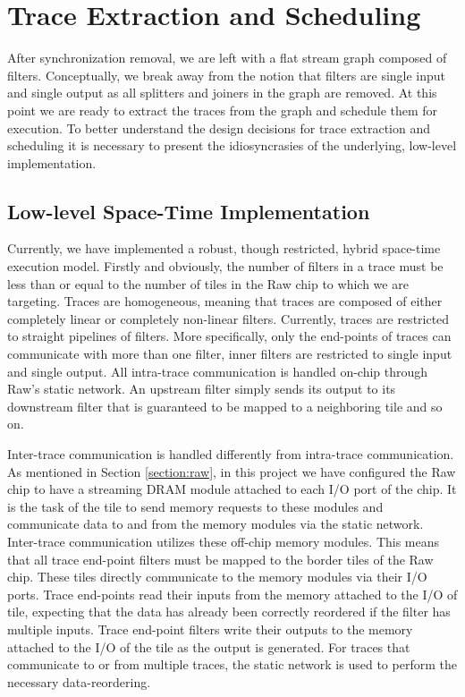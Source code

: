 \section{Trace Extraction and Scheduling}
\label{sec:traces}
After synchronization removal, we are left with a flat stream graph
composed of filters.  Conceptually, we break away from the notion that
filters are single input and single output as all splitters and
joiners in the graph are removed.  At this point we are ready to
extract the traces from the graph and schedule them for execution.  To
better understand the design decisions for trace extraction and
scheduling it is necessary to present the idiosyncrasies of the
underlying, low-level implementation.

\subsection{Low-level Space-Time Implementation}
Currently, we have implemented a robust, though restricted, hybrid
space-time execution model.  Firstly and obviously, the number of
filters in a trace must be less than or equal to the number of tiles
in the Raw chip to which we are targeting.  Traces are homogeneous,
meaning that traces are composed of either completely linear or
completely non-linear filters.  Currently, traces are restricted to
straight pipelines of filters.  More specifically, only the end-points
of traces can communicate with more than one filter, inner filters are
restricted to single input and single output.  All intra-trace
communication is handled on-chip through Raw's static network.  An
upstream filter simply sends its output to its downstream filter that
is guaranteed to be mapped to a neighboring tile and so on.

Inter-trace communication is handled differently from intra-trace
communication.  As mentioned in Section \ref{section:raw}, in this
project we have configured the Raw chip to have a streaming DRAM
module attached to each I/O port of the chip.  It is the task of the
tile to send memory requests to these modules and communicate data to
and from the memory modules via the static network.  Inter-trace
communication utilizes these off-chip memory modules.  This means that
all trace end-point filters must be mapped to the border tiles of the
Raw chip.  These tiles directly communicate to the memory modules via
their I/O ports.  Trace end-points read their inputs from the memory
attached to the I/O of tile, expecting that the data has already been
correctly reordered if the filter has multiple inputs.  Trace
end-point filters write their outputs to the memory attached to the
I/O of the tile as the output is generated. For traces that
communicate to or from multiple traces, the static network is used to
perform the necessary data-reordering.

